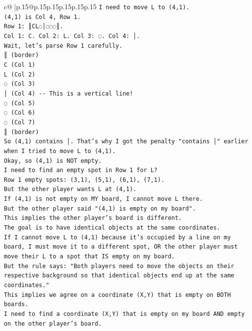 \documentclass{article}
\begin{document}
{\begin{supertabular}{c@{$\;$}|p{.15\linewidth}@{}p{.15\linewidth}p{.15\linewidth}p{.15\linewidth}p{.15\linewidth}p{.15\linewidth}}
{{{\texttt{I need to move L to (4,1).} \\
\texttt{(4,1) is Col 4, Row 1.} \\
\texttt{Row 1: ║CL◌│◌◌◌║.} \\
\texttt{Col 1: C. Col 2: L. Col 3: ◌. Col 4: │.} \\
\texttt{Wait, let's parse Row 1 carefully.} \\
\texttt{║ (border)} \\
\texttt{C (Col 1)} \\
\texttt{L (Col 2)} \\
\texttt{◌ (Col 3)} \\
\texttt{│ (Col 4) {-}{-} This is a vertical line!} \\
\texttt{◌ (Col 5)} \\
\texttt{◌ (Col 6)} \\
\texttt{◌ (Col 7)} \\
\texttt{║ (border)} \\
\texttt{So (4,1) contains │. That's why I got the penalty "contains │" earlier when I tried to move L to (4,1).} \\
\texttt{Okay, so (4,1) is NOT empty.} \\
\texttt{I need to find an empty spot in Row 1 for L?} \\
\texttt{Row 1 empty spots: (3,1), (5,1), (6,1), (7,1).} \\
\texttt{But the other player wants L at (4,1).} \\
\texttt{If (4,1) is not empty on MY board, I cannot move L there.} \\
\texttt{But the other player said "(4,1) is empty on my board".} \\
\texttt{This implies the other player's board is different.} \\
\texttt{The goal is to have identical objects at the same coordinates.} \\
\texttt{If I cannot move L to (4,1) because it's occupied by a line on my board, I must move it to a different spot, OR the other player must move their L to a spot that IS empty on my board.} \\
\texttt{But the rule says: "Both players need to move the objects on their respective background so that identical objects end up at the same coordinates."} \\
\texttt{This implies we agree on a coordinate (X,Y) that is empty on BOTH boards.} \\
\texttt{I need to find a coordinate (X,Y) that is empty on my board AND empty on the other player's board.} \\
}}}
\end{supertabular}}
\end{document}
